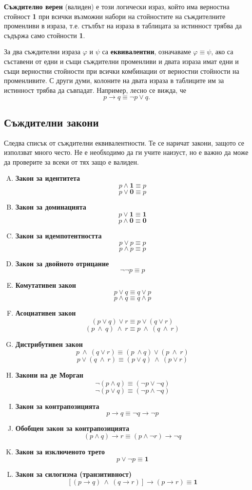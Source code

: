 {\bf Съждително верен} (валиден) е този логически израз, който има верностна стойност {\bf 1} при всички възможни набори на
стойностите на съждителните променливи в израза, т.е. стълбът на израза в таблицата за истинност трябва да съдържа само 
стойности {\bf 1}. 

За два съждителни израза $\varphi$ и $\psi$ са {\bf еквивалентни}, означаваме $\varphi \equiv \psi$, ако са съставени от 
едни и същи съждителни променливи и двата израза имат едни и същи верностни стойности при всички комбинации от верностни 
стойности на променливите. С други думи, колоните на двата израза в таблиците им за истинност трябва да съвпадат.
Например, лесно се вижда, че 
\[p\to q \equiv \neg p \vee q.\]

\subsection*{Съждителни закони}

Следва списък от съждителни еквивалентности.
Те се наричат закони, защото се използват много често.
Не е необходимо да ги учите наизуст, но е важно да може да
проверите за всеки от тях защо е валиден.

\begin{enumerate}[A)]
\item
  {\bf Закон за идентитета}
  \[p \land \mathbf{1} \equiv p\]
  \[p \lor \mathbf{0} \equiv p\]
\item
  {\bf Закон за доминацията}
  \[p \lor \mathbf{1} \equiv \mathbf{1}\]
  \[p \land \mathbf{0} \equiv \mathbf{0}\]
\item
  {\bf Закон за идемпотентността}
  \[p \lor p \equiv p\]
  \[p \land p \equiv p\]
\item
  {\bf Закон за двойното отрицание}
  \[\neg \neg p \equiv p\]
\item
  {\bf Комутативен закон}
  \[p\vee q \equiv q\vee p\] 
  \[p \wedge q \equiv q \wedge p\]
\item
  {\bf Асоциативен закон}
  \[(p\vee q)\vee r \equiv p\vee(q\vee r)\]
  \[(p\ \wedge\ q)\ \wedge\ r \equiv p\ \wedge\ (q\ \wedge\ r)\]
\item
  {\bf Дистрибутивен закон}
  \[p\ \wedge\ (q \vee r) \equiv (p\ \wedge q)\vee (p\ \wedge\ r)\]
  \[p\vee (q\ \wedge\ r) \equiv (p\vee q)\ \wedge\ (p\vee r)\]
\item
  {\bf Закони на де Морган}
  \[\neg(p \wedge q) \equiv (\neg p \vee \neg q)\]
  \[\neg(p\vee q) \equiv (\neg p \wedge \neg q)\]
\item
  {\bf Закон за контрапозицията}
  \[p\rightarrow q \equiv \neg q \rightarrow \neg p\]
\item
  {\bf Обобщен закон за контрапозицията}
  \[(p \wedge q)\rightarrow r \equiv (p \wedge \neg r) \rightarrow \neg q\]
\item
  {\bf Закон за изключеното трето}
  \[p\vee \neg p \equiv {\mathbf 1}\]
\item
  {\bf Закон за силогизма (транзитивност)}
  \[[(p\rightarrow q)\ \wedge\ (q\rightarrow r)] \rightarrow (p\rightarrow r) \equiv {\mathbf 1}\]
\end{enumerate}

